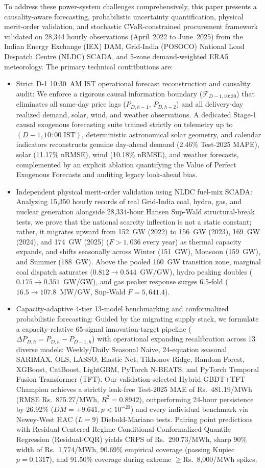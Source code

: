 \documentclass[runningheads,a4paper]{llncs}
\begin{document}
To address these power-system challenges comprehensively, this paper presents a causality-aware forecasting, probabilistic uncertainty quantification, physical merit-order validation, and stochastic CVaR-constrained procurement framework validated on 28,344 hourly observations (April~2022 to June~2025) from the Indian Energy Exchange (IEX) DAM, Grid-India (POSOCO) National Load Despatch Centre (NLDC) SCADA, and 5-zone demand-weighted ERA5 meteorology. The primary technical contributions are:
\begin{itemize}
    \item Strict D-1 10:30~AM IST operational forecast reconstruction and causality audit: We enforce a rigorous causal information boundary ($\mathcal{F}_{D-1, 10:30}$) that eliminates all same-day price lags ($P_{D,h-1}$, $P_{D,h-2}$) and all delivery-day realized demand, solar, wind, and weather observations. A dedicated Stage-1 causal exogenous forecasting suite trained strictly on telemetry up to $(D-1, 10:00\text{~IST})$, deterministic astronomical solar geometry, and calendar indicators reconstructs genuine day-ahead demand (2.46\% Test-2025 MAPE), solar (11.17\% nRMSE), wind (10.18\% nRMSE), and weather forecasts, complemented by an explicit ablation quantifying the Value of Perfect Exogenous Forecasts and auditing legacy look-ahead bias.
    \item Independent physical merit-order validation using NLDC fuel-mix SCADA: Analyzing 15,350 hourly records of real Grid-India coal, hydro, gas, and nuclear generation alongside 28,334-hour Hansen Sup-Wald structural-break tests, we prove that the national scarcity inflection is not a static constant; rather, it migrates upward from 152~GW (2022) to 156~GW (2023), 169~GW (2024), and 174~GW (2025) ($F > 1,036$ every year) as thermal capacity expands, and shifts seasonally across Winter (151~GW), Monsoon (159~GW), and Summer (188~GW). Above the pooled 160~GW transition zone, marginal coal dispatch saturates ($0.812 \to 0.544$~GW/GW), hydro peaking doubles ($0.175 \to 0.351$~GW/GW), and gas peaker response surges 6.5-fold ($16.5 \to 107.8$~MW/GW, Sup-Wald $F = 5,641.4$).
    \item Capacity-adaptive 4-tier 13-model benchmarking and conformalized probabilistic forecasting: Guided by the migrating supply stack, we formulate a capacity-relative 65-signal innovation-target pipeline ($\Delta P_{D,h} = P_{D,h} - P_{D-1,h}$) with operational expanding recalibration across 13 diverse models: Weekly/Daily Seasonal Naive, 24-equation seasonal SARIMAX, OLS, LASSO, Elastic Net, Tikhonov Ridge, Random Forest, XGBoost, CatBoost, LightGBM, PyTorch N-BEATS, and PyTorch Temporal Fusion Transformer (TFT). Our validation-selected Hybrid GBDT+TFT Champion achieves a strictly leak-free Test-2025 MAE of Rs.~481.19/MWh (RMSE Rs.~875.27/MWh, $R^2 = 0.8942$), outperforming 24-hour persistence by 26.92\% ($DM = +9.641, p < 10^{-20}$) and every individual benchmark via Newey-West HAC ($L=9$) Diebold-Mariano tests. Pairing point predictions with Residual-Centered Regime-Conditional Conformalized Quantile Regression (Residual-CQR) yields CRPS of Rs.~290.73/MWh, sharp 90\% width of Rs.~1,774/MWh, 90.69\% empirical coverage (passing Kupiec $p = 0.1317$), and 91.50\% coverage during extreme $\ge$Rs.~8,000/MWh spikes.

\end{itemize}
\end{document}
